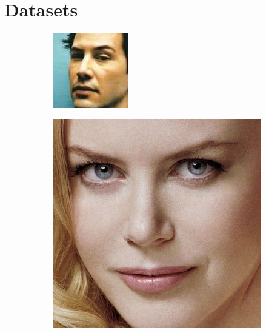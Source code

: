 \documentclass[twocolumn]{article}
\begin{document}
\section{Datasets}
\begin{figure}[h]
    \centering
    \begin{subfigure}[b]{0.3\linewidth}
        \includegraphics[width=\linewidth]{images/dataset/Keanu_Reeves_308}
        \label{fig:keanu}
    \end{subfigure}
    \hfill
    \begin{subfigure}[b]{0.3\linewidth}
        \includegraphics[width=\linewidth]{images/dataset/Nicole_Kidman_386}

\end{subfigure}
\end{figure}
\end{document}
